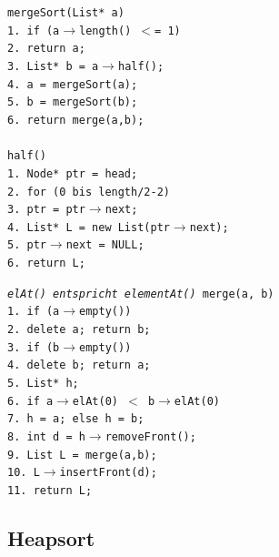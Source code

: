 \documentclass[fs, footer]{latex4ei}
\renewcommand{\t}{\texttt}
\begin{document}
\begin{multicols*}{4}
{{\parbox{4.5cm}{
\t{mergeSort(List* a)\\
1.	if (a$\rightarrow$length() $<$= 1)\\
2.	\quad return a;\\
3.	List* b = a$\rightarrow$half();\\
4.	a = mergeSort(a);\\
5.	b = mergeSort(b);\\
6.	return merge(a,b);\\
\\
half()\\
1.	Node* ptr = head;\\
2.	for (0 bis length/2-2)\\
3.	\quad ptr = ptr$\rightarrow$next;\\
4.	List* L = new List(ptr$\rightarrow$next);\\
5.	ptr$\rightarrow$next = NULL;\\
6.	return L;
}}\hspace{-1.2cm}
\parbox{3.5cm}{
\t{\textit{elAt() entspricht elementAt()}
merge(a, b)\\
1.	if (a$\rightarrow$empty())\\
2.	\quad delete a; return b;\\
3.	if (b$\rightarrow$empty())\\
4.	\quad delete b; return a;\\
5.	List* h;\\
6.	if a$\rightarrow$elAt(0) $<$ b$\rightarrow$elAt(0)\\
7.	\quad h = a; else h = b;\\
8.	int d = h$\rightarrow$removeFront();\\
9.	List L = merge(a,b);\\
10.	L$\rightarrow$insertFront(d);\\
11.	return L;\\
}}

\iffalse
\subsection{Heapsort}

\begin{multicols}{2}


\end{multicols}}}
\end{multicols*}
\end{document}
